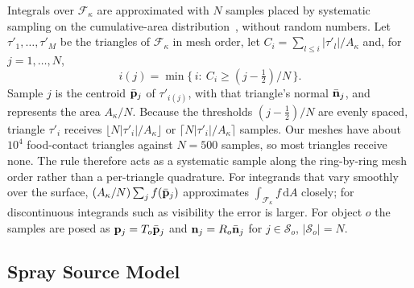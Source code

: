 Integrals over $\mathcal{F}_\kappa$ are approximated with $N$ samples placed by systematic sampling on the cumulative-area distribution~\cite{cochran1977sampling}, without random numbers.
Let $\tau'_1,\dots,\tau'_M$ be the triangles of $\mathcal{F}_\kappa$ in mesh order, let $C_i=\sum_{l\le i}|\tau'_l|/A_\kappa$ and, for $j=1,\dots,N$,
\begin{equation}
i(j)=\min\bigl\{\,i:\ C_i\ge (j-\tfrac12)/N\,\bigr\}.
\label{eq:sampling}
\end{equation}
Sample $j$ is the centroid $\bar{\mathbf{p}}_j$ of $\tau'_{i(j)}$, with that triangle's normal $\bar{\mathbf{n}}_j$, and represents the area $A_\kappa/N$.
Because the thresholds $(j-\frac12)/N$ are evenly spaced, triangle $\tau'_i$ receives $\lfloor N|\tau'_i|/A_\kappa\rfloor$ or $\lceil N|\tau'_i|/A_\kappa\rceil$ samples.
Our meshes have about $10^4$ food-contact triangles against $N=500$ samples, so most triangles receive none.
The rule therefore acts as a systematic sample along the ring-by-ring mesh order rather than a per-triangle quadrature.
For integrands that vary smoothly over the surface, $(A_\kappa/N)\sum_j f(\bar{\mathbf{p}}_j)$ approximates $\int_{\mathcal{F}_\kappa}f\,\mathrm{d}A$ closely; for discontinuous integrands such as visibility the error is larger.
For object $o$ the samples are posed as $\mathbf{p}_j=T_o\bar{\mathbf{p}}_j$ and $\mathbf{n}_j=R_o\bar{\mathbf{n}}_j$ for $j\in\mathcal{S}_o$, $|\mathcal{S}_o|=N$.

\subsection{Spray Source Model}
\label{sec:scoring-sources}

